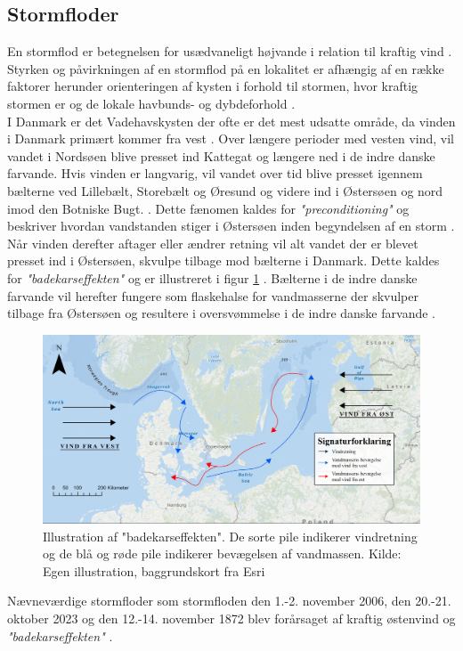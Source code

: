 
\subsection{Stormfloder} \label{Afsnit: Stormfloder}

En stormflod er betegnelsen for usædvaneligt højvande i relation til kraftig vind \citep{shoreline_management_guidelines}.
Styrken og påvirkningen af en stormflod på en lokalitet er afhængig af en række faktorer herunder orienteringen af kysten i forhold til stormen, hvor kraftig stormen er og de lokale havbunds- og dybdeforhold \citep{noaa_storm, shoreline_management_guidelines}.\\

I Danmark er det Vadehavskysten der ofte er det mest udsatte område, da vinden i Danmark primært kommer fra vest \citep{cappelen_dmi_2020}. Over længere perioder med vesten vind, vil vandet i Nordsøen blive presset ind Kattegat og længere ned i de indre danske farvande. Hvis vinden er langvarig, vil vandet over tid blive presset igennem bælterne ved Lillebælt, Storebælt og Øresund og videre ind i Østersøen og nord imod den Botniske Bugt. \citep{kystdirektoratet_stormfloder}. Dette fænomen kaldes for \textit{"preconditioning"} og beskriver hvordan vandstanden stiger i Østersøen inden begyndelsen af en storm \citep{kiesel_brief_2024, weisse_sea_2021}. \\   

Når vinden derefter aftager eller ændrer retning vil alt vandet der er blevet presset ind i Østersøen, skvulpe tilbage mod bælterne i Danmark. Dette kaldes for \textit{"badekarseffekten"} og er illustreret i figur \ref{Figur: Bathtub effect} \citep{kystdirektoratet_stormfloder, egusphere_baltic}. Bælterne i de indre danske farvande vil herefter fungere som flaskehalse for vandmasserne der skvulper tilbage fra Østersøen og resultere i oversvømmelse i de indre danske farvande \citep{egusphere_baltic}.
\begin{figure}[H]
    \centering
    \includegraphics[width=0.8\linewidth]{images/teori/bathtub effect graphics.jpg}
    \caption{Illustration af "badekarseffekten". De sorte pile indikerer vindretning og de blå og røde pile indikerer bevægelsen af vandmassen. Kilde: Egen illustration, baggrundskort fra Esri}
    \label{Figur: Bathtub effect}
\end{figure}
Nævneværdige stormfloder som stormfloden den 1.-2. november 2006, den 20.-21. oktober 2023 og den 12.-14. november 1872 blev forårsaget af kraftig østenvind og \textit{"badekarseffekten"} \hspace{1.5cm} \citep{kystdirektoratet_stormfloder}.

